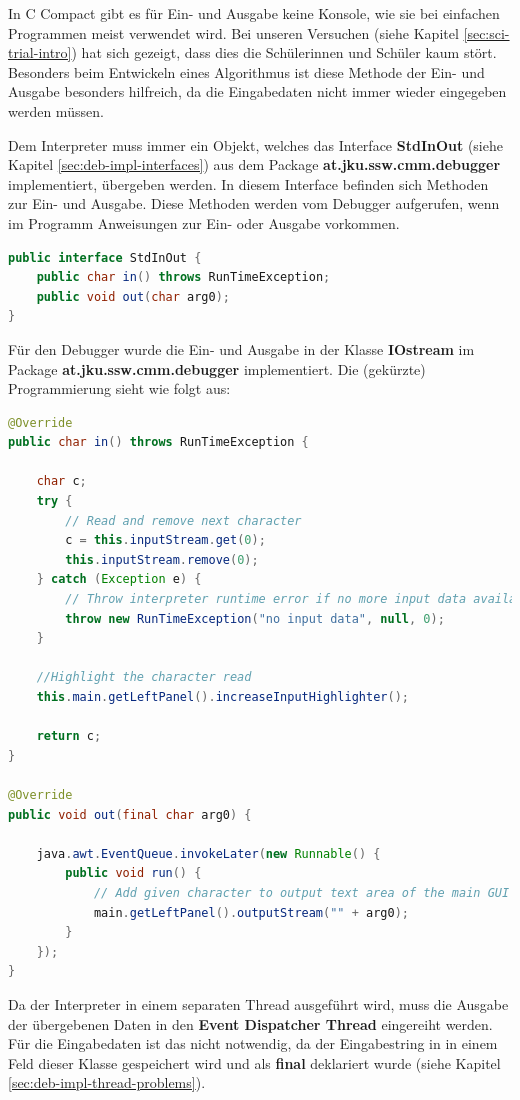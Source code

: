 In C Compact gibt es für Ein- und Ausgabe keine Konsole, wie sie bei einfachen Programmen meist verwendet wird. Bei unseren Versuchen (siehe Kapitel \ref{sec:sci-trial-intro}) hat sich gezeigt, dass dies die Schülerinnen und Schüler kaum stört. Besonders beim Entwickeln eines Algorithmus ist diese Methode der Ein- und Ausgabe besonders hilfreich, da die Eingabedaten nicht immer wieder eingegeben werden müssen.

Dem Interpreter muss immer ein Objekt, welches das Interface \textbf{StdInOut} (siehe Kapitel \ref{sec:deb-impl-interfaces}) aus dem Package \textbf{at.jku.ssw.cmm.debugger} implementiert, übergeben werden. In diesem Interface befinden sich Methoden zur Ein- und Ausgabe. Diese Methoden werden vom Debugger aufgerufen, wenn im Programm Anweisungen zur Ein- oder Ausgabe vorkommen.

\begin{lstlisting}[language=JAVA]
public interface StdInOut {
	public char in() throws RunTimeException;
	public void out(char arg0);
}
\end{lstlisting}

Für den Debugger wurde die Ein- und Ausgabe in der Klasse \textbf{IOstream} im Package \textbf{at.jku.ssw.cmm.debugger} implementiert. Die (gekürzte) Programmierung sieht wie folgt aus:

\begin{lstlisting}[language=JAVA]
@Override
public char in() throws RunTimeException {

	char c;
	try {
		// Read and remove next character
		c = this.inputStream.get(0);
		this.inputStream.remove(0);
	} catch (Exception e) {
		// Throw interpreter runtime error if no more input data available
		throw new RunTimeException("no input data", null, 0);
	}
	
	//Highlight the character read
	this.main.getLeftPanel().increaseInputHighlighter();
	
	return c;
}

@Override
public void out(final char arg0) {

	java.awt.EventQueue.invokeLater(new Runnable() {
		public void run() {
			// Add given character to output text area of the main GUI
			main.getLeftPanel().outputStream("" + arg0);
		}
	});
}
\end{lstlisting}

Da der Interpreter in einem separaten Thread ausgeführt wird, muss die Ausgabe der übergebenen Daten in den \textbf{Event Dispatcher Thread} eingereiht werden. Für die Eingabedaten ist das nicht notwendig, da der Eingabestring in in einem Feld dieser Klasse gespeichert wird und als \textbf{final} deklariert wurde (siehe Kapitel \ref{sec:deb-impl-thread-problems}).

